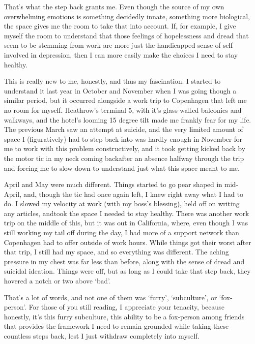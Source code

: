 That's what the step back grants me. Even though the source of my own overwhelming emotions is something decidedly innate, something more biological, the space gives me the room to take that into account. If, for example, I give myself the room to understand that those feelings of hopelessness and dread that seem to be stemming from work are more just the handicapped sense of self involved in depression, then I can more easily make the choices I need to stay healthy.

This is really new to me, honestly, and thus my fascination. I started to understand it last year in October and November when I was going though a similar period, but it occurred alongside a work trip to Copenhagen that left me no room for myself. Heathrow's terminal 5, with it's glass-walled balconies and walkways, and the hotel's looming 15 degree tilt made me frankly fear for my life. The previous March saw an attempt at suicide, and the very limited amount of space I (figuratively) had to step back into was hardly enough in November for me to work with this problem constructively, and it took getting kicked back by the motor tic in my neck coming backafter an absence halfway through the trip and forcing me to slow down to understand just what this space meant to me.

April and May were much different. Things started to go pear shaped in mid-April, and, though the tic had once again left, I knew right away what I had to do. I slowed my velocity at work (with my boss's blessing), held off on writing any articles, andtook the space I needed to stay healthy. There was another work trip on the middle of this, but it was out in California, where, even though I was still working my tail off during the day, I had more of a support network than Copenhagen had to offer outside of work hours. While things got their worst after that trip, I still had my space, and so everything was different. The aching pressure in my chest was far less than before, along with the sense of dread and suicidal ideation. Things were off, but as long as I could take that step back, they hovered a notch or two above `bad'.

That's a lot of words, and not one of them was `furry', `subculture', or `fox-person'. For those of you still reading, I appreciate your tenacity, because honestly, it's this furry subculture, this ability to be a fox-person among friends that provides the framework I need to remain grounded while taking these countless steps back, lest I just withdraw completely into myself.

